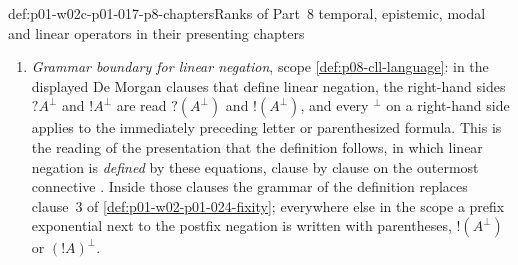 \begin{hbconvention}{def:p01-w02c-p01-017-p8-chapters}{Ranks of Part~8 temporal, epistemic, modal and linear operators in their presenting chapters}
\begin{enumerate}
  connective table and the phase interpretation of that section the sign
  is always the additive conjunction.
\item \emph{Grammar boundary for linear negation}, scope
  \cref{def:p08-cll-language}: in the displayed De Morgan clauses that
  define linear negation, the right-hand sides \(?A^\perp\) and
  \(!A^\perp\) are read \(?(A^\perp)\) and \(!(A^\perp)\), and every
  \({}^\perp\) on a right-hand side applies to the immediately preceding
  letter or parenthesized formula.  This is the reading of the
  presentation that the definition follows, in which linear negation is
  \emph{defined} by these equations, clause by clause on the outermost
  connective \cite[\S1.2.2, p.~10]{Girard1995}.  Inside those clauses the
  grammar of the definition replaces clause~3 of
  \cref{def:p01-w02-p01-024-fixity}; everywhere else in the scope a
  prefix exponential next to the postfix negation is written with
  parentheses, \(!(A^\perp)\) or \((!A)^\perp\).
\end{enumerate}
\end{hbconvention}

